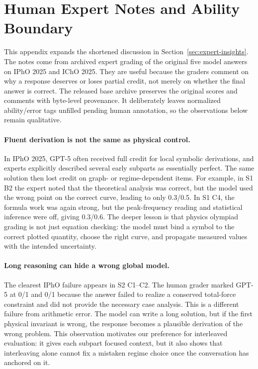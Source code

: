 \documentclass[11pt]{article}
\begin{document}
\section{Human Expert Notes and Ability Boundary}
\label{app:expert_notes}
This appendix expands the shortened discussion in Section~\ref{sec:expert-insights}.
The notes come from archived expert grading of the original five model answers on IPhO 2025 and IChO 2025.
They are useful because the graders comment on why a response deserves or loses partial credit, not merely on whether the final answer is correct.
The released base archive preserves the original scores and comments with byte-level provenance. It deliberately leaves normalized ability/error tags unfilled pending human annotation, so the observations below remain qualitative.

\paragraph{Fluent derivation is not the same as physical control.}
In IPhO 2025, GPT-5 often received full credit for local symbolic derivations, and experts explicitly described several early subparts as essentially perfect.
The same solution then lost credit on graph- or regime-dependent items.
For example, in S1 B2 the expert noted that the theoretical analysis was correct, but the model used the wrong point on the correct curve, leading to only 0.3/0.5.
In S1 C4, the formula work was again strong, but the peak-frequency reading and statistical inference were off, giving 0.3/0.6.
The deeper lesson is that physics olympiad grading is not just equation checking: the model must bind a symbol to the correct plotted quantity, choose the right curve, and propagate measured values with the intended uncertainty.

\paragraph{Long reasoning can hide a wrong global model.}
The clearest IPhO failure appears in S2 C1--C2.
The human grader marked GPT-5 at 0/1 and 0/1 because the answer failed to realize a conserved total-force constraint and did not provide the necessary case analysis.
This is a different failure from arithmetic error.
The model can write a long solution, but if the first physical invariant is wrong, the response becomes a plausible derivation of the wrong problem.
This observation motivates our preference for interleaved evaluation: it gives each subpart focused context, but it also shows that interleaving alone cannot fix a mistaken regime choice once the conversation has anchored on it.
\end{document}
